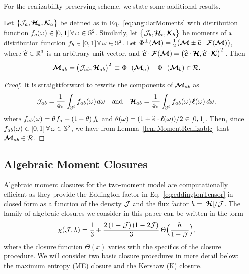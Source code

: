 For the realizability-preserving scheme, we state some additional results.  
\begin{lemma}
  Let $\big\{\mathcal{J}_{a},\boldsymbol{\mathcal{H}}_{a},\boldsymbol{\mathcal{K}}_{a}\big\}$ be defined as in Eq.~\eqref{eq:angularMoments} with distribution function $f_{a}(\omega)\in[0,1]\,\forall\,\omega\in\mathbb{S}^{2}$.  
  Similarly, let $\big\{\mathcal{J}_{b},\boldsymbol{\mathcal{H}}_{b},\boldsymbol{\mathcal{K}}_{b}\big\}$ be moments of a distribution function $f_{b}\in[0,1]\,\forall\,\omega\in\mathbb{S}^{2}$.  
  Let $\Phi^{\pm}(\boldsymbol{\mathcal{M}})=\frac{1}{2}\big(\boldsymbol{\mathcal{M}}\pm\widehat{\boldsymbol{e}}\cdot\boldsymbol{\mathcal{F}}(\boldsymbol{\mathcal{M}})\big)$, where $\widehat{\boldsymbol{e}}\in\mathbb{R}^{3}$ is an arbitrary unit vector, and $\widehat{\boldsymbol{e}}\cdot\boldsymbol{\mathcal{F}}(\boldsymbol{\mathcal{M}})=\big(\widehat{\boldsymbol{e}}\cdot\boldsymbol{\mathcal{H}},\widehat{\boldsymbol{e}}\cdot\boldsymbol{\mathcal{K}}\big)^{T}$.  
  Then
  \begin{equation*}
    \boldsymbol{\mathcal{M}}_{ab} = \big(\mathcal{J}_{ab},\boldsymbol{\mathcal{H}}_{ab}\big)^{T} \equiv \Phi^{+}(\boldsymbol{\mathcal{M}}_{a})+\Phi^{-}(\boldsymbol{\mathcal{M}}_{b})\in\mathcal{R}.
  \end{equation*}
\end{lemma}
\begin{proof}
  It is straightforward to rewrite the components of $\boldsymbol{\mathcal{M}}_{ab}$ as
  \begin{equation*}
    \mathcal{J}_{ab}=\frac{1}{4\pi}\int_{\mathbb{S}^{2}}f_{ab}(\omega)\,d\omega
    \quad\text{and}\quad
    \boldsymbol{\mathcal{H}}_{ab}=\frac{1}{4\pi}\int_{\mathbb{S}^{2}}f_{ab}(\omega)\,\boldsymbol{\ell}(\omega)\,d\omega,
  \end{equation*}
  where $f_{ab}(\omega)=\theta\,f_{a}+(1-\theta)\,f_{b}$ and $\theta(\omega)=(1+\widehat{\boldsymbol{e}}\cdot\boldsymbol{\ell}(\omega))/2\in[0,1]$.  
  Then, since $f_{ab}(\omega)\in[0,1]\,\forall\,\omega\in\mathbb{S}^{2}$, we have from Lemma~\ref{lem:MomentRealizable} that $\boldsymbol{\mathcal{M}}_{ab}\in\mathcal{R}$.  
\end{proof}

\subsection{Algebraic Moment Closures}

Algebraic moment closures for the two-moment model are computationally efficient as they provide the Eddington factor in Eq.~\eqref{eq:eddingtonTensor} in closed form as a function of the density $\mathcal{J}$ and the flux factor $h=|\boldsymbol{\mathcal{H}}|/\mathcal{J}$.  
The family of algebraic closures we consider in this paper can be written in the form \cite{cernohorskyBludman_1994}
\begin{equation}
  \chi(\mathcal{J},h)=\frac{1}{3}+\frac{2\,(1-\mathcal{J})\,(1-2\mathcal{J})}{3}\,\Theta\Big(\frac{h}{1-\mathcal{J}}\Big),
\end{equation}
where the closure function $\Theta(x)$ varies with the specifics of the closure procedure.  
We will consider two basic closure procedures in more detail below: the maximum entropy (ME) closure and the Kershaw (K) closure.  

